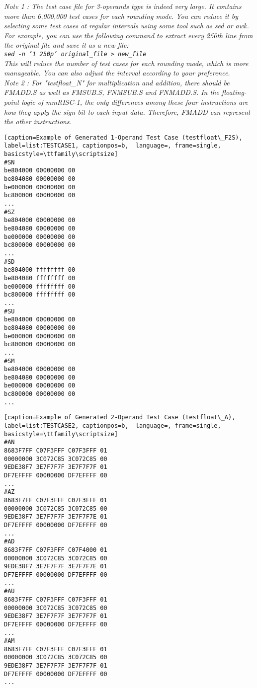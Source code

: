 \begin{description}
\it{Note 1 : The test case file for 3-operands type is indeed very large. It contains more than 6,000,000 test cases for each rounding mode. You can reduce it by selecting some test cases at regular intervals using some tool such as sed or awk. For example, you can use the following command to extract every 250th line from the original file and save it as a new file:\\
\texttt{sed -n '1~250p' original\_file > new\_file}\\
This will reduce the number of test cases for each rounding mode, which is more manageable. You can also adjust the interval according to your preference.}\rm{}\\

\it{Note 2 : For "testfloat\_N" for multiplication and addition, there should be FMADD.S as well as FMSUB.S, FNMSUB.S and FNMADD.S. In the floating-point logic of mmRISC-1, the only differences among these four instructions are how they apply the sign bit to each input data. Therefore, FMADD can represent the other instructions.}\rm{}

\begin{lstlisting}[caption=Example of Generated 1-Operand Test Case (testfloat\_F2S), label=list:TESTCASE1, captionpos=b,  language=, frame=single, basicstyle=\ttfamily\scriptsize]
#SN
be804000 00000000 00
be804080 00000000 00
be000000 00000000 00
bc800000 00000000 00
...
#SZ
be804000 00000000 00
be804080 00000000 00
be000000 00000000 00
bc800000 00000000 00
...
#SD
be804000 ffffffff 00
be804080 ffffffff 00
be000000 ffffffff 00
bc800000 ffffffff 00
...
#SU
be804000 00000000 00
be804080 00000000 00
be000000 00000000 00
bc800000 00000000 00
...
#SM
be804000 00000000 00
be804080 00000000 00
be000000 00000000 00
bc800000 00000000 00
...
\end{lstlisting}

\begin{lstlisting}[caption=Example of Generated 2-Operand Test Case (testfloat\_A), label=list:TESTCASE2, captionpos=b,  language=, frame=single, basicstyle=\ttfamily\scriptsize]
#AN
8683F7FF C07F3FFF C07F3FFF 01
00000000 3C072C85 3C072C85 00
9EDE38F7 3E7F7F7F 3E7F7F7F 01
DF7EFFFF 00000000 DF7EFFFF 00
...
#AZ
8683F7FF C07F3FFF C07F3FFF 01
00000000 3C072C85 3C072C85 00
9EDE38F7 3E7F7F7F 3E7F7F7E 01
DF7EFFFF 00000000 DF7EFFFF 00
...
#AD
8683F7FF C07F3FFF C07F4000 01
00000000 3C072C85 3C072C85 00
9EDE38F7 3E7F7F7F 3E7F7F7E 01
DF7EFFFF 00000000 DF7EFFFF 00
...
#AU
8683F7FF C07F3FFF C07F3FFF 01
00000000 3C072C85 3C072C85 00
9EDE38F7 3E7F7F7F 3E7F7F7F 01
DF7EFFFF 00000000 DF7EFFFF 00
...
#AM
8683F7FF C07F3FFF C07F3FFF 01
00000000 3C072C85 3C072C85 00
9EDE38F7 3E7F7F7F 3E7F7F7F 01
DF7EFFFF 00000000 DF7EFFFF 00
...
\end{lstlisting}


\end{description}
